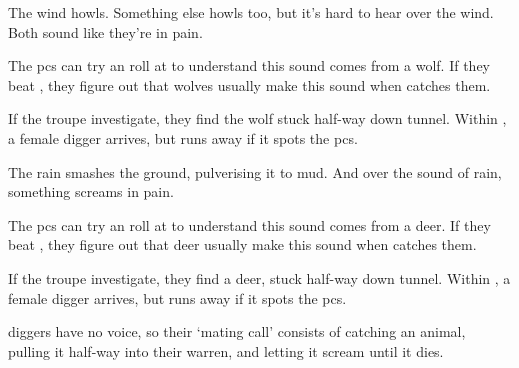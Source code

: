 \ifodd\thefenestraYear
  \begin{boxtext}
    The wind howls.
    Something else howls too, but it's hard to hear over the wind.
    Both sound like they're in pain.
  \end{boxtext}

  The \glspl{pc} can try an  roll at \tn[10] to understand this sound comes from a wolf.
  If they beat \tn[12], they figure out that wolves usually make this sound when  catches them.

  If the troupe investigate, they find the wolf stuck half-way down  tunnel.
  Within , a female \gls{digger} arrives, but runs away if it spots the \glspl{pc}.

\else
  \begin{boxtext}
    The rain smashes the ground, pulverising it to mud.
    And over the sound of rain, something screams in pain.
  \end{boxtext}

  The \glspl{pc} can try an  roll at \tn[10] to understand this sound comes from a deer.
  If they beat \tn[12], they figure out that deer usually make this sound when  catches them.

  If the troupe investigate, they find a deer, stuck half-way down  tunnel.
  Within , a female \gls{digger} arrives, but runs away if it spots the \glspl{pc}.

\fi

\Glspl{digger} have no voice, so their `mating call' consists of catching an animal, pulling it half-way into their warren, and letting it scream until it dies.

